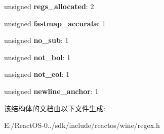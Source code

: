 \begin{DoxyCompactItemize}
unsigned {\bfseries regs\+\_\+allocated}\+: 2
\item 
\mbox{\label{structre__pattern__buffer_a837b026312b860e5485da6240b10d8f7}} 
unsigned {\bfseries fastmap\+\_\+accurate}\+: 1
\item 
\mbox{\label{structre__pattern__buffer_a83e122c96edb258aa4ef99d7a8b2bfa2}} 
unsigned {\bfseries no\+\_\+sub}\+: 1
\item 
\mbox{\label{structre__pattern__buffer_a4a5d480a0891afbab92cf486a04e4a68}} 
unsigned {\bfseries not\+\_\+bol}\+: 1
\item 
\mbox{\label{structre__pattern__buffer_a875954f4e64b585471f67b334d33799c}} 
unsigned {\bfseries not\+\_\+eol}\+: 1
\item 
\mbox{\label{structre__pattern__buffer_a46ed7a16b4cb87267ac5d219dab3536a}} 
unsigned {\bfseries newline\+\_\+anchor}\+: 1
\end{DoxyCompactItemize}


该结构体的文档由以下文件生成\+:\begin{DoxyCompactItemize}
\item 
E\+:/\+React\+O\+S-\/0../sdk/include/reactos/wine/regex.\+h\end{DoxyCompactItemize}
